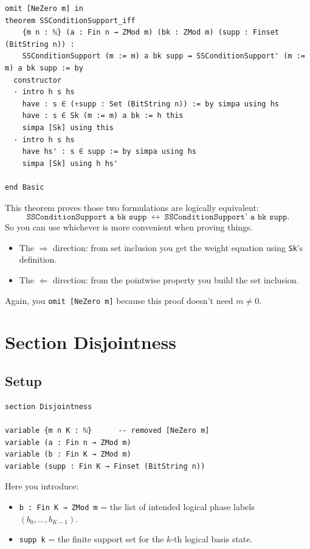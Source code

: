\documentclass[11pt]{article}
\begin{document}
\begin{lstlisting}
omit [NeZero m] in
theorem SSConditionSupport_iff
    {m n : ℕ} (a : Fin n → ZMod m) (bk : ZMod m) (supp : Finset (BitString n)) :
    SSConditionSupport (m := m) a bk supp ↔ SSConditionSupport' (m := m) a bk supp := by
  constructor
  · intro h s hs
    have : s ∈ (↑supp : Set (BitString n)) := by simpa using hs
    have : s ∈ Sk (m := m) a bk := h this
    simpa [Sk] using this
  · intro h s hs
    have hs' : s ∈ supp := by simpa using hs
    simpa [Sk] using h hs'

end Basic
\end{lstlisting}

This theorem proves those two formulations are logically equivalent:
\[
\texttt{SSConditionSupport a bk supp} \;\leftrightarrow\; \texttt{SSConditionSupport' a bk supp}.
\]
So you can use whichever is more convenient when proving things.

\begin{itemize}
\item The $\Rightarrow$ direction: from set inclusion you get the weight equation using \texttt{Sk}’s definition.
\item The $\Leftarrow$ direction: from the pointwise property you build the set inclusion.
\end{itemize}

Again, you \texttt{omit [NeZero m]} because this proof doesn’t need $m\neq 0$.

\section*{Section Disjointness}

\subsection*{Setup}

\begin{lstlisting}
section Disjointness

variable {m n K : ℕ}      -- removed [NeZero m]
variable (a : Fin n → ZMod m)
variable (b : Fin K → ZMod m)
variable (supp : Fin K → Finset (BitString n))
\end{lstlisting}

Here you introduce:
\begin{itemize}
\item \texttt{b : Fin K → ZMod m} = the list of intended logical phase labels $(b_0,\dots,b_{K-1})$.
\item \texttt{supp k} = the finite support set for the $k$-th logical basis state.
\end{itemize}
\end{document}
